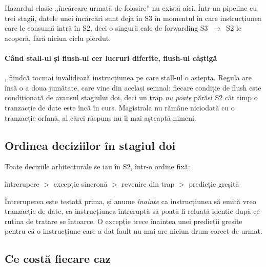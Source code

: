 \documentclass[11pt,openany]{report}
\begin{document}
Hazardul clasic ,,încărcare urmată de folosire'' nu există aici. Într-un
pipeline cu trei stagii, datele unei încărcări sunt deja în S3 în momentul în
care instrucțiunea care le consumă intră în S2, deci o singură cale de
forwarding S3~$\rightarrow$~S2 le acoperă, fără niciun ciclu pierdut.

\paragraph{Când stall-ul și flush-ul cer lucruri diferite, flush-ul câștigă}, fiindcă
tocmai invalidează instrucțiunea pe care stall-ul o aștepta. Regula are însă o a
doua jumătate, care vine din același semnal: fiecare condiție de flush este
condiționată de avansul stagiului doi, deci un trap \emph{nu poate} părăsi S2
cât timp o tranzacție de date este încă în curs. Magistrala nu rămâne niciodată
cu o tranzacție orfană, al cărei răspuns nu îl mai așteaptă nimeni.

\subsection{Ordinea deciziilor în stagiul doi}

Toate deciziile arhitecturale se iau în S2, într-o ordine fixă:

\begin{center}
întrerupere \; $>$ \; excepție sincronă \; $>$ \; revenire din trap \; $>$ \;
predicție greșită
\end{center}

Întreruperea este testată prima, și anume \emph{înainte} ca instrucțiunea să
emită vreo tranzacție de date, ca instrucțiunea întreruptă să poată fi reluată
identic după ce rutina de tratare se întoarce. O excepție trece înaintea unei
predicții greșite pentru că o instrucțiune care a dat fault nu mai are niciun
drum corect de urmat.

\subsection{Ce costă fiecare caz}
\end{document}
